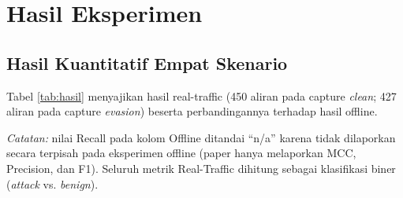\documentclass[11pt, a4paper]{article}
\begin{document}
\section{Hasil Eksperimen}

\subsection{Hasil Kuantitatif Empat Skenario}
Tabel \ref{tab:hasil} menyajikan hasil real-traffic (450 aliran pada capture \textit{clean}; 427 aliran pada capture \textit{evasion}) beserta perbandingannya terhadap hasil offline.

\begin{table}[htbp]
\centering
\caption{Perbandingan Metrik Lengkap Offline vs. Real-Traffic (RT-S1--RT-S4, konfigurasi Top-10, $\epsilon = 0{,}10$)}
\label{tab:hasil}
\small
{}
\end{table}

\noindent\footnotesize\textit{Catatan:} nilai Recall pada kolom Offline ditandai ``n/a'' karena tidak dilaporkan secara terpisah pada eksperimen offline (paper hanya melaporkan MCC, Precision, dan F1). Seluruh metrik Real-Traffic dihitung sebagai klasifikasi biner (\textit{attack} vs. \textit{benign}).\normalsize
\end{document}
